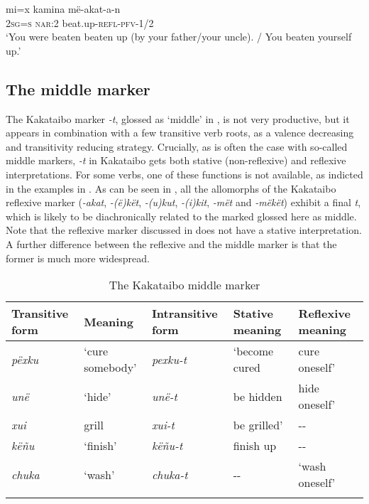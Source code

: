\documentclass[output=paper,colorlinks,citecolor=brown,modfonts,nonflat]{langscibook}
\begin{document}
\ea%
    \label{ex:zariquiey:11}
    \gll    mi=x kamina më-akat-a-n\\
            \textsc{2sg=s} \textsc{nar:2} beat.up-\textsc{refl-pfv-1/2}\\
    \glt    ‘You were beaten beaten up (by your father/your uncle). / You beaten yourself up.’
\z

\subsection{The middle marker}\label{sec:zariquiey:3.2}

The Kakataibo marker \textit{{}-t}, glossed as ‘middle’ in \citet[308]{Zariquiey2018}, is not very productive, but it appears in combination with a few transitive verb roots, as a valence decreasing and transitivity reducing strategy. Crucially, as is often the case with so-called middle markers, \textit{{}-t} in Kakataibo gets both stative (non-reflexive) and reflexive interpretations. For some verbs, one of these functions is not available, as indicted in the examples in . As can be seen in , all the allomorphs of the Kakataibo reflexive marker (\textit{{}-akat}, \textit{{}-(ë)kët}, \textit{{}-(u)kut}, \textit{{}-(i)kit}, \textit{-mët} and \textit{{}-mëkët}) exhibit a final \textit{t}, which is likely to be diachronically related to the marked glossed here as middle. Note that the reflexive marker discussed in  does not have a stative interpretation. A further difference between the reflexive and the middle marker is that the former is much more widespread.

\begin{table}
    \caption{The Kakataibo middle marker}
    \label{tab:zariquiey:3}
    \begin{tabularx}{\textwidth}{XXXXX}
        \lsptoprule
        Transitive form & Meaning & Intransitive form & Stative meaning & Reflexive meaning\\
        \midrule
        \textit{pëxku} & ‘cure somebody’ & \textit{pexku-t} & ‘become cured & cure oneself’\\
        \textit{unë} & ‘hide’ & \textit{unë-t} & be hidden & hide oneself’\\
        \textit{xui} & grill & \textit{xui-t} & be grilled’ & {}-{}-\\
        \textit{këñu} & ‘finish’ & \textit{këñu-t} & finish up & {}-{}-\\
        \textit{chuka} & ‘wash’ & \textit{chuka-t} & {}-{}- & ‘wash oneself’\\
        \lspbottomrule
    \end{tabularx}
\end{table}
\end{document}
